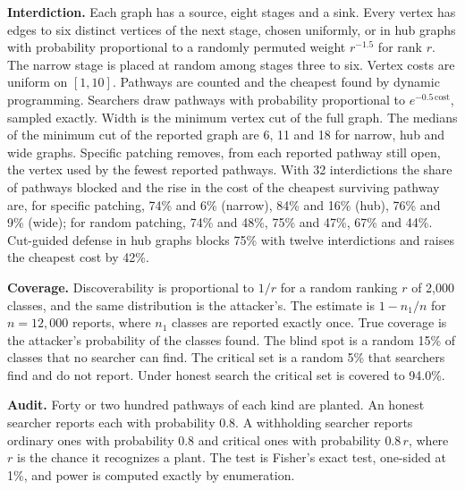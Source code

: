 \documentclass[10pt,twocolumn,letterpaper]{article}
\theoremstyle{definition}
\newcommand{\para}[1]{\smallskip\noindent\textbf{#1}\enspace}
\newcommand{\RepCutNarrow}{6}
\newcommand{\RepCutHub}{11}
\newcommand{\RepCutWide}{18}
\newcommand{\CutBlockHubTwelve}{75}
\newcommand{\CutGainHubTwelve}{42}
\newcommand{\PatchSpecBlockNarrow}{74}
\newcommand{\PatchSpecGainNarrow}{6}
\newcommand{\PatchRandBlockNarrow}{74}
\newcommand{\PatchRandGainNarrow}{48}
\newcommand{\PatchSpecBlockHub}{84}
\newcommand{\PatchSpecGainHub}{16}
\newcommand{\PatchRandBlockHub}{75}
\newcommand{\PatchRandGainHub}{47}
\newcommand{\PatchSpecBlockWide}{76}
\newcommand{\PatchSpecGainWide}{9}
\newcommand{\PatchRandBlockWide}{67}
\newcommand{\PatchRandGainWide}{44}
\newcommand{\CritHonest}{94.0}
\begin{document}
\para{Interdiction.} Each graph has a source, eight stages and a sink. Every vertex has edges to six distinct vertices of the next stage, chosen uniformly, or in hub graphs with probability proportional to a randomly permuted weight $r^{-1.5}$ for rank $r$. The narrow stage is placed at random among stages three to six. Vertex costs are uniform on $[1,10]$. Pathways are counted and the cheapest found by dynamic programming. Searchers draw pathways with probability proportional to $e^{-0.5\,\mathrm{cost}}$, sampled exactly. Width is the minimum vertex cut of the full graph. The medians of the minimum cut of the reported graph are \RepCutNarrow, \RepCutHub{} and \RepCutWide{} for narrow, hub and wide graphs. Specific patching removes, from each reported pathway still open, the vertex used by the fewest reported pathways. With 32 interdictions the share of pathways blocked and the rise in the cost of the cheapest surviving pathway are, for specific patching, \PatchSpecBlockNarrow\% and \PatchSpecGainNarrow\% (narrow), \PatchSpecBlockHub\% and \PatchSpecGainHub\% (hub), \PatchSpecBlockWide\% and \PatchSpecGainWide\% (wide); for random patching, \PatchRandBlockNarrow\% and \PatchRandGainNarrow\%, \PatchRandBlockHub\% and \PatchRandGainHub\%, \PatchRandBlockWide\% and \PatchRandGainWide\%. Cut-guided defense in hub graphs blocks \CutBlockHubTwelve\% with twelve interdictions and raises the cheapest cost by \CutGainHubTwelve\%.

\para{Coverage.} Discoverability is proportional to $1/r$ for a random ranking $r$ of 2,000 classes, and the same distribution is the attacker's. The estimate is $1-n_{1}/n$ for $n=12{,}000$ reports, where $n_{1}$ classes are reported exactly once. True coverage is the attacker's probability of the classes found. The blind spot is a random 15\% of classes that no searcher can find. The critical set is a random 5\% that searchers find and do not report. Under honest search the critical set is covered to \CritHonest\%.

\para{Audit.} Forty or two hundred pathways of each kind are planted. An honest searcher reports each with probability 0.8. A withholding searcher reports ordinary ones with probability 0.8 and critical ones with probability $0.8\,r$, where $r$ is the chance it recognizes a plant. The test is Fisher's exact test, one-sided at 1\%, and power is computed exactly by enumeration.
\end{document}
